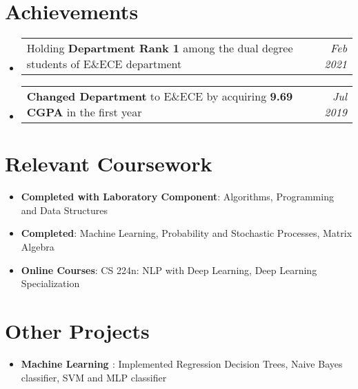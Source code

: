 \documentclass[a4,10pt]{article}
\makeatletter
\newcommand{\resumeItem}[2]{
  \item\small{
    \textbf{#1}{: #2 \vspace{-2pt}}
  }
}
\newcommand{\resumeSubItem}[2]{\resumeItem{#1}{#2}\vspace{-4pt}}
\newcommand{\resumeSubHeadingListStart}{\begin{itemize}[leftmargin=*]}
\newcommand{\resumeSubHeadingListEnd}{\end{itemize}}
\newcommand{\chrono}[2]{
\item
    \begin{tabular*}{0.97\textwidth}{l@{\extracolsep{\fill}}r}
      #1 & \textit{#2}
    \end{tabular*}
}
\makeatother
\begin{document}
\section{Achievements}
  \begin{itemize}[leftmargin=*]
      \itemsep-0.15em
      \chrono {Holding \textbf{Department Rank 1} among the dual degree students of E\&ECE department}{Feb 2021}
      \chrono {\textbf{Changed Department} to E\&ECE by acquiring \textbf{9.69 CGPA} in the first year}{Jul 2019}
    \end{itemize}
  
 \section{Relevant Coursework}
  \resumeSubHeadingListStart
    \resumeSubItem{Completed with Laboratory Component}
      {Algorithms, Programming and Data Structures}
    \resumeSubItem{Completed}
      {Machine Learning, Probability and Stochastic Processes, Matrix Algebra}
    \resumeSubItem{Online Courses}
      {CS 224n: NLP with Deep Learning, Deep Learning Specialization}
  \resumeSubHeadingListEnd
  
\section{Other Projects}
  \resumeSubHeadingListStart
    \resumeSubItem{Machine Learning \href{https://github.com/utkarsh512/CS60050-Machine-Learning}{\faGithub} }
      {Implemented Regression Decision Trees, Naive Bayes classifier, SVM and MLP classifier}
  \resumeSubHeadingListEnd
\end{document}
